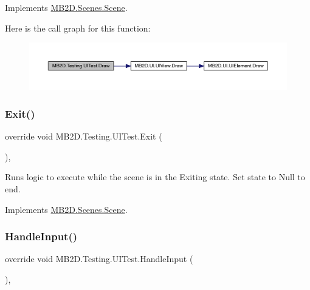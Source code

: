 Implements \hyperlink{class_m_b2_d_1_1_scenes_1_1_scene_a932d33071ecb4c5187367825dba72324}{M\+B2\+D.\+Scenes.\+Scene}.

Here is the call graph for this function\+:
\nopagebreak
\begin{figure}[H]
\begin{center}
\leavevmode
\includegraphics[width=350pt]{class_m_b2_d_1_1_testing_1_1_u_i_test_a9656d2d62517288a7b4387dafe741ea0_cgraph}
\end{center}
\end{figure}
\hypertarget{class_m_b2_d_1_1_testing_1_1_u_i_test_ad7ad379db3fc9990e634b3edbd4b1a41}{}\label{class_m_b2_d_1_1_testing_1_1_u_i_test_ad7ad379db3fc9990e634b3edbd4b1a41} 
\subsubsection{\texorpdfstring{Exit()}{Exit()}}
{\footnotesize\ttfamily override void M\+B2\+D.\+Testing.\+U\+I\+Test.\+Exit (\begin{DoxyParamCaption}{ }\end{DoxyParamCaption})\hspace{0.3cm}{\ttfamily [inline]}, {\ttfamily [virtual]}}



Runs logic to execute while the scene is in the Exiting state. Set state to Null to end. 



Implements \hyperlink{class_m_b2_d_1_1_scenes_1_1_scene_a099b79e16d23b67349847999d2336813}{M\+B2\+D.\+Scenes.\+Scene}.

\hypertarget{class_m_b2_d_1_1_testing_1_1_u_i_test_abfdabac63f2f6dd07e49c181ce84b24d}{}\label{class_m_b2_d_1_1_testing_1_1_u_i_test_abfdabac63f2f6dd07e49c181ce84b24d} 
\subsubsection{\texorpdfstring{Handle\+Input()}{HandleInput()}}
{\footnotesize\ttfamily override void M\+B2\+D.\+Testing.\+U\+I\+Test.\+Handle\+Input (\begin{DoxyParamCaption}{ }\end{DoxyParamCaption})\hspace{0.3cm}{\ttfamily [inline]}, {\ttfamily [virtual]}}



